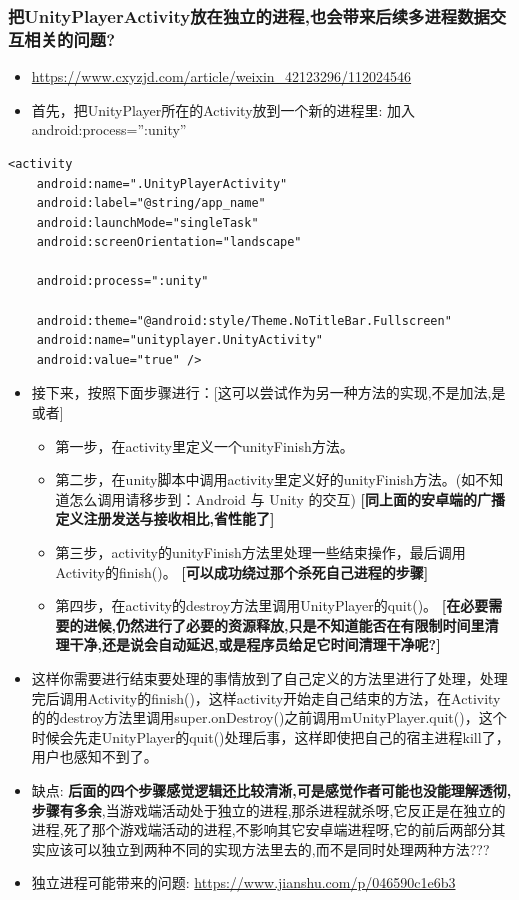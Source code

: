\documentclass[9pt, b5paper]{article}
\begin{document}
\subsubsection{把UnityPlayerActivity放在独立的进程,也会带来后续多进程数据交互相关的问题?}
\label{sec-1-2-5}
\begin{itemize}
\item \url{https://www.cxyzjd.com/article/weixin_42123296/112024546}
\item 首先，把UnityPlayer所在的Activity放到一个新的进程里: 加入android:process=”:unity”
\end{itemize}
\begin{verbatim}
<activity
    android:name=".UnityPlayerActivity"
    android:label="@string/app_name"
    android:launchMode="singleTask" 
    android:screenOrientation="landscape"

    android:process=":unity"

    android:theme="@android:style/Theme.NoTitleBar.Fullscreen"
    android:name="unityplayer.UnityActivity"
    android:value="true" />
\end{verbatim}
\begin{itemize}
\item 接下来，按照下面步骤进行：[这可以尝试作为另一种方法的实现,不是加法,是或者]
\begin{itemize}
\item 第一步，在activity里定义一个unityFinish方法。
\item 第二步，在unity脚本中调用activity里定义好的unityFinish方法。(如不知道怎么调用请移步到：Android 与 Unity 的交互) \textbf{[同上面的安卓端的广播定义注册发送与接收相比,省性能了]}
\item 第三步，activity的unityFinish方法里处理一些结束操作，最后调用Activity的finish()。 \textbf{[可以成功绕过那个杀死自己进程的步骤]}
\item 第四步，在activity的destroy方法里调用UnityPlayer的quit()。 \textbf{[在必要需要的进候,仍然进行了必要的资源释放,只是不知道能否在有限制时间里清理干净,还是说会自动延迟,或是程序员给足它时间清理干净呢?]}
\end{itemize}
\item 这样你需要进行结束要处理的事情放到了自己定义的方法里进行了处理，处理完后调用Activity的finish()，这样activity开始走自己结束的方法，在Activity的的destroy方法里调用super.onDestroy()之前调用mUnityPlayer.quit()，这个时候会先走UnityPlayer的quit()处理后事，这样即使把自己的宿主进程kill了，用户也感知不到了。
\item 缺点: \textbf{后面的四个步骤感觉逻辑还比较清淅,可是感觉作者可能也没能理解透彻,步骤有多余},当游戏端活动处于独立的进程,那杀进程就杀呀,它反正是在独立的进程,死了那个游戏端活动的进程,不影响其它安卓端进程呀,它的前后两部分其实应该可以独立到两种不同的实现方法里去的,而不是同时处理两种方法???
\item 独立进程可能带来的问题: \url{https://www.jianshu.com/p/046590c1e6b3}
\end{itemize}
\end{document}
